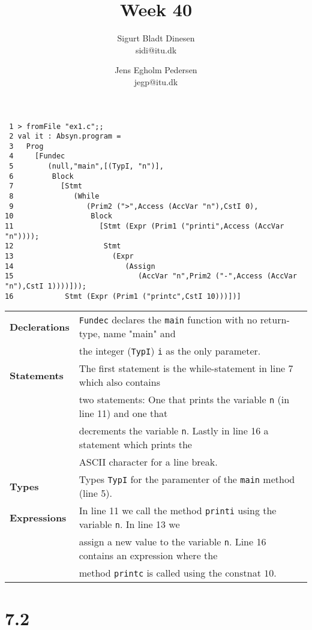 \documentclass[a4paper, titlepage]{article}
\begin{document}
\title{Week 40}
\author{Sigurt Bladt Dinesen \\sidi{@}itu.dk \and Jens Egholm Pedersen \\jegp{@}itu.dk}
\maketitle
\begin{verbatim}
 1 > fromFile "ex1.c";;
 2 val it : Absyn.program =
 3   Prog
 4     [Fundec
 5        (null,"main",[(TypI, "n")],
 6         Block
 7           [Stmt
 8              (While
 9                 (Prim2 (">",Access (AccVar "n"),CstI 0),
10                  Block
11                    [Stmt (Expr (Prim1 ("printi",Access (AccVar "n"))));
12                     Stmt
13                       (Expr
14                          (Assign
15                             (AccVar "n",Prim2 ("-",Access (AccVar "n"),CstI 1))))]));
16            Stmt (Expr (Prim1 ("printc",CstI 10)))])]
\end{verbatim}

\quad

\begin{tabular}{l l}
  \textbf{Declerations} & \texttt{Fundec} declares the \texttt{main} function with no return-type, name "main" and \\
                        & the integer (\texttt{TypI}) \texttt{i} as the only parameter. \\
  \textbf{Statements} & The first statement is the while-statement in line 7 which also contains \\
                      & two statements: One that prints the variable \texttt{n} (in line 11) and one that \\
                      & decrements the variable \texttt{n}. Lastly in line 16 a statement which prints the \\
                      & ASCII character for a line break. \\
  \textbf{Types} & Types \texttt{TypI} for the paramenter of the \texttt{main} method (line 5). \\
  \textbf{Expressions} & In line 11 we call the method \texttt{printi} using the variable \texttt{n}. In line 13 we \\
                       & assign a new value to the variable \texttt{n}. Line 16 contains an expression where the \\
                       & method \texttt{printc} is called using the constnat $10$.
\end{tabular}

\section*{7.2}
\end{document}
